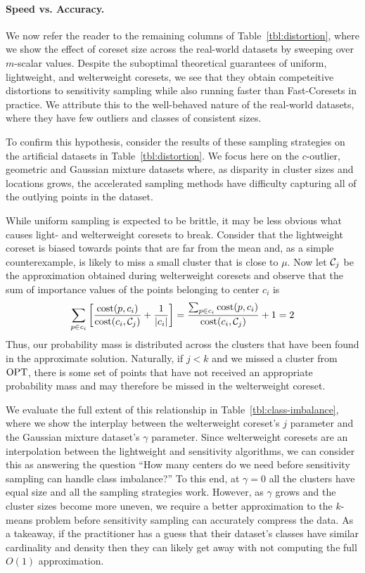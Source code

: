 \paragraph*{Speed vs. Accuracy.}

We now refer the reader to the remaining columns of Table~\ref{tbl:distortion}, where we show the effect of coreset size across the real-world datasets by
sweeping over $m$-scalar values. Despite the suboptimal theoretical guarantees of uniform, lightweight, and welterweight coresets, we see that they obtain
competeitive distortions to sensitivity sampling while also running faster than Fast-Coresets in practice. We attribute this to the well-behaved nature of the
real-world datasets, where they have few outliers and classes of consistent sizes.

To confirm this hypothesis, consider the results of these sampling strategies on the artificial datasets in Table~\ref{tbl:distortion}. We focus here on
the $c$-outlier, geometric and Gaussian mixture datasets where, as disparity in cluster sizes and locations grows, the accelerated sampling methods have
difficulty capturing all of the outlying points in the dataset.

While uniform sampling is expected to be brittle, it may be less obvious what causes light- and welterweight coresets to break. Consider that the lightweight
coreset is biased towards points that are far from the mean and, as a simple counterexample, is likely to miss a small cluster that is close to $\mu$.  Now let
$\mathcal C_j$ be the approximation obtained during welterweight coresets and observe that the sum of importance values of the points belonging to center $c_i$ is
\begin{equation*}
    \sum_{p \in c_i} \left[ \dfrac{\operatorname{cost}(p, c_i)}{\operatorname{cost}(c_i, \mathcal C_j)} + \dfrac{1}{|c_i|} \right]
    = \dfrac{\sum_{p \in c_i} \operatorname{cost}(p, c_i)}{\operatorname{cost}(c_i, \mathcal C_j)} + 1
    = 2
\end{equation*}
Thus, our probability mass is distributed across the clusters that have been found in the approximate solution. Naturally, if $j < k$ and we missed a cluster
from $\text{OPT}$, there is some set of points that have not received an appropriate probability mass and may therefore be missed in the welterweight coreset.

We evaluate the full extent of this relationship in Table~\ref{tbl:class-imbalance}, where we show the interplay between the welterweight coreset's $j$
parameter and the Gaussian mixture dataset's $\gamma$ parameter. Since welterweight coresets are an interpolation between the lightweight and sensitivity
algorithms, we can consider this as answering the question ``How many centers do we need before sensitivity sampling can handle class imbalance?'' To this end,
at $\gamma = 0$ all the clusters have equal size and all the sampling strategies work. However, as $\gamma$ grows and the cluster sizes become more uneven, we
require a better approximation to the $k$-means problem before sensitivity sampling can accurately compress the data. As a takeaway, if the practitioner has
a guess that their dataset's classes have similar cardinality and density then they can likely get away with not computing the full $O(1)$ approximation.

